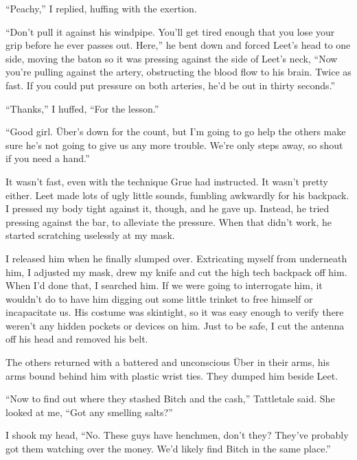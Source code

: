 ``Peachy,'' I replied, huffing with the exertion.



``Don't pull it against his windpipe.  You'll get tired enough that you lose your grip before he ever passes out.  Here,'' he bent down and forced Leet's head to one side, moving the baton so it was pressing against the side of Leet's neck, ``Now you're pulling against the artery, obstructing the blood flow to his brain.  Twice as fast.  If you could put pressure on both arteries, he'd be out in thirty seconds.''



``Thanks,'' I huffed, ``For the lesson.''



``Good girl.  \"{U}ber's down for the count, but I'm going to go help the others make sure he's not going to give us any more trouble.  We're only steps away, so shout if you need a hand.''



It wasn't fast, even with the technique Grue had instructed.  It wasn't pretty either.  Leet made lots of ugly little sounds, fumbling awkwardly for his backpack.  I pressed my body tight against it, though, and he gave up.  Instead, he tried pressing against the bar, to alleviate the pressure.  When that didn't work, he started scratching uselessly at my mask.



I released him when he finally slumped over.  Extricating myself from underneath him, I adjusted my mask, drew my knife and cut the high tech backpack off him.  When I'd done that, I searched him.  If we were going to interrogate him, it wouldn't do to have him digging out some little trinket to free himself or incapacitate us.  His costume was skintight, so it was easy enough to verify there weren't any hidden pockets or devices on him.  Just to be safe, I cut the antenna off his head and removed his belt.



The others returned with a battered and unconscious \"{U}ber in their arms, his arms bound behind him with plastic wrist ties.  They dumped him beside Leet.



``Now to find out where they stashed Bitch and the cash,'' Tattletale said.  She looked at me, ``Got any smelling salts?''



I shook my head, ``No.  These guys have henchmen, don't they?  They've probably got them watching over the money.  We'd likely find Bitch in the same place.''



